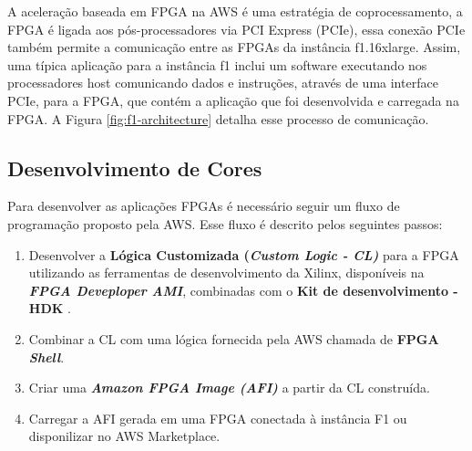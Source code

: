 A aceleração baseada em FPGA na AWS é uma estratégia de coprocessamento, a FPGA é ligada aos pós-processadores via PCI Express (PCIe), essa conexão PCIe também permite a comunicação entre as FPGAs da instância f1.16xlarge. Assim, uma típica aplicação para a instância f1 inclui um software executando nos processadores host comunicando dados e instruções, através de uma interface PCIe, para a FPGA, que contém a aplicação que foi desenvolvida e carregada na FPGA. A Figura \ref{fig:f1-architecture} detalha esse processo de comunicação.


   
\begin{figure}[h!] 
   	    \captionsetup{width=12cm}%
	\end{figure}
    

\subsection{Desenvolvimento de Cores} \label{sec:dev}

Para desenvolver as aplicações FPGAs é necessário seguir um fluxo de programação proposto pela AWS. Esse fluxo é descrito pelos seguintes passos:

\begin{enumerate}
    \item Desenvolver a \textbf{Lógica Customizada (\textit{Custom Logic - CL)}} para a FPGA utilizando as ferramentas de desenvolvimento da Xilinx, disponíveis na \textbf{\textit{FPGA Deveploper AMI}}, combinadas com o \textbf{Kit de desenvolvimento - HDK }.
    
    \item Combinar a CL com uma lógica fornecida pela AWS chamada de \textbf{FPGA \textit{Shell}}.
    
    \item Criar uma \textbf{\textit{Amazon FPGA Image (AFI)}} a partir da CL construída.
    
    \item Carregar a AFI gerada em uma FPGA conectada à instância F1 ou disponilizar no AWS Marketplace.
\end{enumerate}

